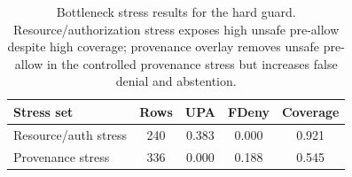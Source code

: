 \begin{table}[t]
\centering
\small
\caption{Bottleneck stress results for the hard guard. Resource/authorization stress exposes high unsafe pre-allow despite high coverage; provenance overlay removes unsafe pre-allow in the controlled provenance stress but increases false denial and abstention.}
\label{tab:bottleneck}
\begin{tabular}{lcccc}
\toprule
Stress set & Rows & UPA & FDeny & Coverage \\
\midrule
Resource/auth stress & 240 & 0.383 & 0.000 & 0.921 \\
Provenance stress & 336 & 0.000 & 0.188 & 0.545 \\
\bottomrule
\end{tabular}
\end{table}
